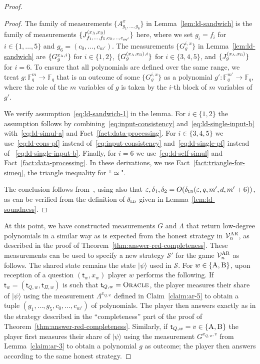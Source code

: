 \documentclass[11pt]{article}
\theoremstyle{definition}
\newcommand{\ket}[1]{|#1\rangle}
\newcommand{\F}{\ensuremath{\mathbb{F}}}
\newcommand{\ld}{\textsc{ld}}
\newcommand{\eps}{\varepsilon}
\newcommand{\verifier}{\mathcal{V}}
\newcommand{\strategy}{\mathscr{S}}
\newcommand{\gamestyle}[1]{\ensuremath{\textsc{#1}}\xspace}
\newcommand{\ar}{\gamestyle{AR}}
\newcommand{\labelstyle}[1]{\ensuremath{\textsc{#1}}\xspace}
\newcommand{\tvarstyle}[1]{\mathsf{#1}}
\newcommand{\tvar}{\ensuremath{\tvarstyle{t}}}
\newcommand{\alice}{\labelstyle{A}}
\newcommand{\bob}{\labelstyle{B}}
\newcommand{\oracle}{\labelstyle{Oracle}}
\begin{document}
\begin{proof}
\begin{proof}
    The family of measurements $\{A^x_{g_1,\ldots,g_6}\}$ in
    Lemma~\ref{lem:ld-sandwich} is the family of measurements
    $\{J^{(x_\alice,x_\bob)}_{f_1,\ldots,f_5,c_0,\ldots,c_{m'}}\}$ here, where
    we set $g_i = f_i$ for $i\in \{1,\ldots,5\}$ and $g_6 =
    (c_0,\ldots,c_{m'})$.
    The measurements $\{G^{i,x}_g\}$ in Lemma~\ref{lem:ld-sandwich} are
    $\{G^{x_\alice,i}_{g}\}$ for $i\in \{1,2\}$,
    $\{G^{(x_\alice,x_\bob),i}_{g}\}$ for $i\in \{3,4,5\}$, and
    $\{J^{(x_\alice,x_\bob)}_g\}$ for $i=6$.
    To ensure that all polynomials are defined over the same range, we treat
    $g:\F_q^m \to \F_q$ that is an outcome of some $\{G^{i,x}_g\}$ as a
    polynomial $g':\F_q^{m'} \to \F_q$, where the role of the $m$ variables of
    $g$ is taken by the $i$-th block of $m$ variables of $g'$.

    We verify assumption~\eqref{eq:ld-sandwich-1} in the lemma.
    For $i\in\{1,2\}$ the assumption follows by
    combining~\eqref{eq:input-consistency} and~\eqref{eq:ld-single-input-b}
    with~\eqref{eq:ld-simul-a} and Fact~\ref{fact:data-processing}.
    For $i\in \{3,4,5\}$ we use~\eqref{eq:ld-cons-pf} instead
    of~\eqref{eq:input-consistency} and~\eqref{eq:ld-single-pf} instead of
    ~\eqref{eq:ld-single-input-b}.
    Finally, for $i=6$ we use~\eqref{eq:ld-self-simul} and
    Fact~\ref{fact:data-processing}.
    In these derivations,
    we use Fact~\ref{fact:triangle-for-simeq}, the triangle inequality for ``$\simeq$".

    The conclusion follows from~, using also that
    $\eps,\delta_1,\delta_2 = O(\delta_{\ld}(\eps,q,m',d,m'+6))$, as can be
    verified from the definition of $\delta_{\ld}$ given in
    Lemma~\ref{lem:ld-soundness}.

\end{proof}

At this point, we have constructed measurements $G$ and $\Lambda$ that return
low-degree polynomials in a similar way as is expected from the honest strategy
in $\verifier_n^\ar$, as described in the proof of
Theorem~\ref{thm:answer-red-completeness}.
These measurements can be used to specify a new strategy $\strategy'$ for the
game $\verifier^\ar_n$ as follows.
The shared state remains the state $\ket{\psi}$ used in $\strategy$.
For $w\in \{\alice,\bob\}$, upon reception of a question $(\tvar_w,x_w)$ player
$w$ performs the following.
If $\tvar_w = (\tvar_{Q,w},\tvar_{\Pi,w})$ is such that $\tvar_{Q,w} = \oracle$,
the player measures their share of $\ket{\psi}$ using the measurement
$\Lambda^{x_{Q,w}}$ defined in Claim~\ref{claim:ar-5} to obtain a tuple
$(g_1,\ldots,g_5,c_0,\ldots,c_{m'})$ of polynomials.
The player then answers exactly as in the strategy described in the
``completeness'' part of the proof of Theorem~\ref{thm:answer-red-completeness}.
Similarly, if $\tvar_{Q,w} = v \in \{\alice,\bob\}$ the player first measures
their share of $\ket{\psi}$ using the measurement $G^{x_{Q,w},v}$ from
Lemma~\ref{claim:ar-3} to obtain a polynomial $g$ as outcome; the player then
answers according to the same honest strategy.
	

\end{proof}
\end{document}
